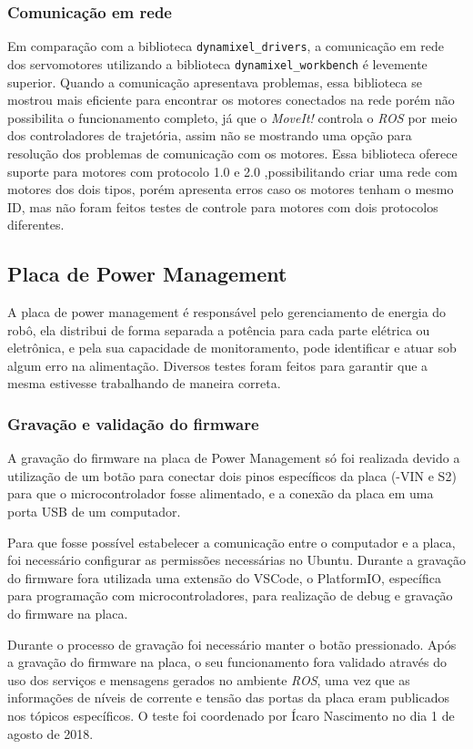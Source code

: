 \subsubsection{Comunicação em rede}
Em comparação com a biblioteca \verb|dynamixel_drivers|, a comunicação em rede dos servomotores utilizando a biblioteca \verb|dynamixel_workbench| é levemente superior. Quando a comunicação apresentava problemas, essa biblioteca se mostrou mais eficiente para encontrar os motores conectados na rede porém não possibilita o funcionamento completo, já que o \textit{MoveIt!} controla o \textit{ROS} por meio dos controladores de trajetória, assim não se mostrando uma opção para resolução dos problemas de comunicação com os motores.
Essa biblioteca oferece suporte para motores com protocolo 1.0 e 2.0 ,possibilitando criar uma rede com motores dos dois tipos, porém apresenta erros caso os motores tenham o mesmo ID, mas não foram feitos testes de controle para motores com dois protocolos diferentes.

\subsection{Placa de Power Management}
A placa de power management é responsável pelo gerenciamento de energia do robô, ela distribui de forma separada a potência para cada parte elétrica ou eletrônica, e pela sua capacidade de monitoramento, pode identificar e atuar sob algum erro na alimentação. Diversos testes foram feitos para garantir que a mesma estivesse trabalhando de maneira correta.

\subsubsection{Gravação e validação do firmware}
A gravação do firmware na placa de Power Management só foi realizada devido a utilização de um botão para conectar dois pinos específicos da placa (-VIN e S2) para que o microcontrolador fosse alimentado, e a conexão da placa em uma porta USB de um computador.
 
Para que fosse possível estabelecer a comunicação entre o computador e a placa, foi necessário configurar as permissões necessárias no Ubuntu. Durante a gravação do firmware fora utilizada uma extensão do VSCode, o PlatformIO, específica para programação com microcontroladores, para realização de debug e gravação do firmware na placa. 

Durante o processo de gravação foi necessário manter o botão pressionado. Após a gravação do firmware na placa, o seu funcionamento fora validado através do uso dos serviços e mensagens gerados no ambiente \textit{ROS}, uma vez que as informações de níveis de corrente e tensão das portas da placa eram publicados nos tópicos específicos. O teste foi coordenado por Ícaro Nascimento no dia 1 de agosto de 2018.

